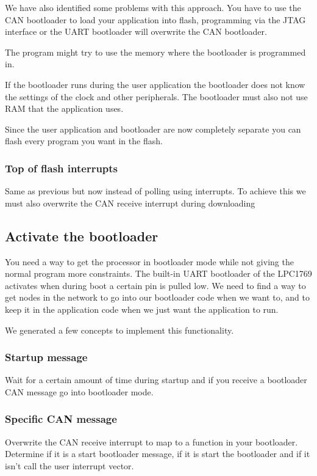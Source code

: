 \documentclass[twocolumn]{article}
\begin{document}
			We have also identified some problems with this approach.
			You have to use the CAN bootloader to load your application into flash,
			programming via the JTAG interface or the UART bootloader will overwrite the CAN bootloader.
			
			The program might try to use the memory where the bootloader is programmed in.
			
			If the bootloader runs during the user application the bootloader does not know the settings of the clock and other peripherals.
			The bootloader must also not use RAM that the application uses. 
			
			Since the user application and bootloader are now completely separate you can flash every program you want in the flash.
			
		\subsubsection*{Top of flash interrupts}
			Same as previous but now instead of polling using interrupts.
			To achieve this we must also overwrite the CAN receive interrupt during downloading
	
	\subsection*{Activate the bootloader}
		You need a way to get the processor in bootloader mode while not giving the normal program more constraints.
		The built-in UART bootloader of the LPC1769 activates when during boot a certain pin is pulled low.
		We need to find a way to get nodes in the network to go into our bootloader code when we want to,
		and to keep it in the application code when we just want the application to run.
		
		We generated a few concepts to implement this functionality.
		
		\subsubsection*{Startup message}
			Wait for a certain amount of time during startup and if you receive a bootloader CAN message go into bootloader mode.
		
		\subsubsection*{Specific CAN message}
			Overwrite the CAN receive interrupt to map to a function in your bootloader.
			Determine if it is a start bootloader message,
			if it is start the bootloader and if it isn't call the user interrupt vector.
			
\end{document}
